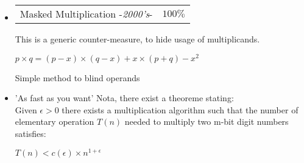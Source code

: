 \begin{itemize}
	\item  	\begin{tabularx}{\linewidth}{ p{16cm} p{1.5cm}}
			Masked Multiplication -\textit{2000's}-  & $100\%$  
			\end{tabularx}
			This is a generic counter-measure, to hide usage of multiplicands.
			\begin{center}	
			$p \times q  = (p-x) \times (q-x) + x \times (p+q) -x^2$
			\end{center}
			\noindent
			Simple method to blind operands

	\item 'As fast as you want'
	Nota, there exist a theoreme stating:\\
	Given $\epsilon>0$ there exists a multiplication algorithm such that the number 		
	of elementary operation $T(n)$ needed to multiply two m-bit digit numbers satisfies:
	\begin{center}
	$T(n) < c(\epsilon) \times n^{1+\epsilon} $
	\end{center}
	

\end{itemize}
